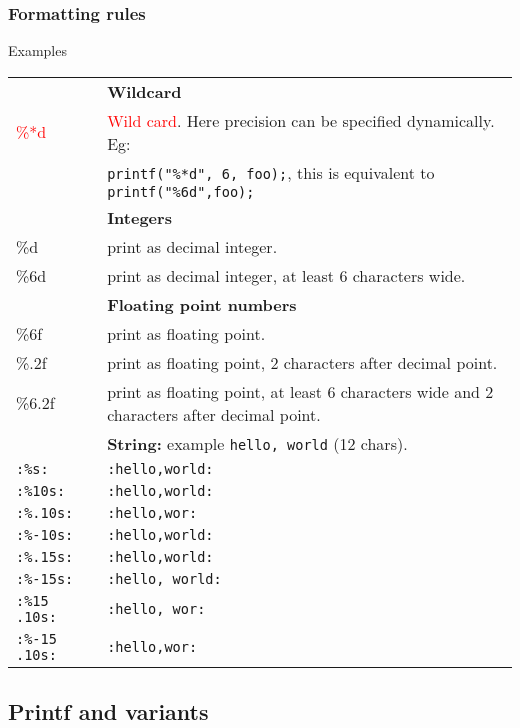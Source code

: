 \begin{multicols*}{3}
\subsubsection{Formatting rules}
Examples
\begin{tabularx}{\linewidth}{lX}
& \textbf{Wildcard}\\
\textcolor{red}{\%*d} & \textcolor{red}{Wild card}. Here precision can be specified dynamically. Eg: \\
& \texttt{printf("\%*d", 6, foo);}, this is equivalent to \texttt{printf("\%6d",foo);}\\
& \textbf{Integers}\\
\%d & print as decimal integer.\\
\%6d & print as decimal integer, at least 6 characters wide.\\
& \textbf{Floating point numbers}\\
\%6f & print as floating point.\\
\%.2f & print as floating point, 2 characters after decimal point.\\
\%6.2f & print as floating point, at least 6 characters wide and 2 characters after decimal point.\\
& \textbf{String:} example \texttt{hello, world} (12 chars).\\
\texttt{:\%s:} & \texttt{:hello,\textvisiblespace world:}\\
\texttt{:\%10s:} & \texttt{:hello,\textvisiblespace world:}\\
\texttt{:\%.10s:} & \texttt{:hello,\textvisiblespace wor:}\\
\texttt{:\%-10s:} & \texttt{:hello,\textvisiblespace world:}\\
\texttt{:\%.15s:} & \texttt{:hello,\textvisiblespace world:}\\
\texttt{:\%-15s:} & \texttt{:hello, world\textvisiblespace\textvisiblespace\textvisiblespace:} \\
\texttt{:\%15 .10s:} & \texttt{:\textvisiblespace\textvisiblespace\textvisiblespace\textvisiblespace\textvisiblespace hello, wor:}\\
\texttt{:\%-15 .10s:} & \texttt{:hello,\textvisiblespace wor\textvisiblespace\textvisiblespace\textvisiblespace\textvisiblespace\textvisiblespace:}\\
\end{tabularx}

\subsection{Printf and variants}


\end{multicols*}

